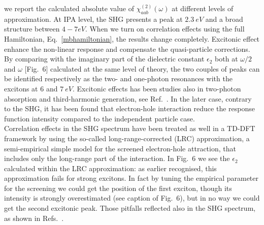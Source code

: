 we report the calculated absolute value of $\chi^{(2)}_{aab} (\omega)$ at different levels of approximation. 
At IPA level, the SHG presents a peak at $2.3~eV$ and a broad structure between $4 - 7 eV$. When we turn on correlation effects using the full Hamiltonian, Eq.~\eqref{mbhamiltonian}, the results change completely.
Excitonic effect enhance the non-linear response and compensate the quasi-particle corrections. By comparing with the imaginary part of the dielectric constant $\epsilon_2$ both at $\omega/2$ and  $\omega$ [Fig.~6] calculated at the same level of theory, the two couples of peaks can be identified respectively as the two- and one-photon resonances with the excitons at $6$ and $7~eV$. 
Excitonic effects has been studies also in two-photon absorption and third-harmonic generation, see Ref.~. In the later case, contrary to the SHG, it has been found that electron-hole interaction reduce the response function intensity compared to the independent particle case.\\ 
Correlation effects in the SHG spectrum have been treated as well in a TD-DFT framework\cite{PhysRevB.82.235201} by using the so-called long-range-corrected (LRC) approximation,\cite{LRC} a semi-empirical simple model for the screened electron-hole attraction, that includes only the long-range part of the interaction. In Fig.~6 we see the $\epsilon_2$ calculated within the LRC approximation: as earlier recognised, this approximation fails for strong excitons. In fact by tuning the empirical parameter for the screening we could get the position of the first exciton, though its intensity is strongly overestimated (see caption of Fig.~6), but in no way we could get the second excitonic peak. Those pitfalls reflected also in the SHG spectrum, as shown in Refs.~\cite{gruningtddf1,gruningtddf2}. 
